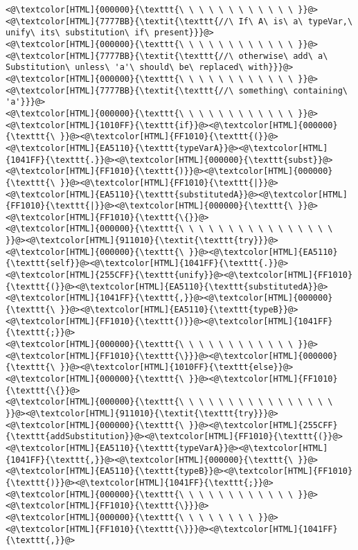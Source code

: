 \begin{lstlisting}
<@\textcolor[HTML]{000000}{\texttt{\ \ \ \ \ \ \ \ \ \ \ \ }}@><@\textcolor[HTML]{7777BB}{\textit{\texttt{//\ If\ A\ is\ a\ typeVar,\ unify\ its\ substitution\ if\ present}}}@>
<@\textcolor[HTML]{000000}{\texttt{\ \ \ \ \ \ \ \ \ \ \ \ }}@><@\textcolor[HTML]{7777BB}{\textit{\texttt{//\ otherwise\ add\ a\ Substitution\ unless\ 'a'\ should\ be\ replaced\ with}}}@>
<@\textcolor[HTML]{000000}{\texttt{\ \ \ \ \ \ \ \ \ \ \ \ }}@><@\textcolor[HTML]{7777BB}{\textit{\texttt{//\ something\ containing\ 'a'}}}@>
<@\textcolor[HTML]{000000}{\texttt{\ \ \ \ \ \ \ \ \ \ \ \ }}@><@\textcolor[HTML]{1010FF}{\texttt{if}}@><@\textcolor[HTML]{000000}{\texttt{\ }}@><@\textcolor[HTML]{FF1010}{\texttt{(}}@><@\textcolor[HTML]{EA5110}{\texttt{typeVarA}}@><@\textcolor[HTML]{1041FF}{\texttt{.}}@><@\textcolor[HTML]{000000}{\texttt{subst}}@><@\textcolor[HTML]{FF1010}{\texttt{)}}@><@\textcolor[HTML]{000000}{\texttt{\ }}@><@\textcolor[HTML]{FF1010}{\texttt{|}}@><@\textcolor[HTML]{EA5110}{\texttt{substitutedA}}@><@\textcolor[HTML]{FF1010}{\texttt{|}}@><@\textcolor[HTML]{000000}{\texttt{\ }}@><@\textcolor[HTML]{FF1010}{\texttt{\{}}@>
<@\textcolor[HTML]{000000}{\texttt{\ \ \ \ \ \ \ \ \ \ \ \ \ \ \ \ }}@><@\textcolor[HTML]{911010}{\textit{\texttt{try}}}@><@\textcolor[HTML]{000000}{\texttt{\ }}@><@\textcolor[HTML]{EA5110}{\texttt{self}}@><@\textcolor[HTML]{1041FF}{\texttt{.}}@><@\textcolor[HTML]{255CFF}{\texttt{unify}}@><@\textcolor[HTML]{FF1010}{\texttt{(}}@><@\textcolor[HTML]{EA5110}{\texttt{substitutedA}}@><@\textcolor[HTML]{1041FF}{\texttt{,}}@><@\textcolor[HTML]{000000}{\texttt{\ }}@><@\textcolor[HTML]{EA5110}{\texttt{typeB}}@><@\textcolor[HTML]{FF1010}{\texttt{)}}@><@\textcolor[HTML]{1041FF}{\texttt{;}}@>
<@\textcolor[HTML]{000000}{\texttt{\ \ \ \ \ \ \ \ \ \ \ \ }}@><@\textcolor[HTML]{FF1010}{\texttt{\}}}@><@\textcolor[HTML]{000000}{\texttt{\ }}@><@\textcolor[HTML]{1010FF}{\texttt{else}}@><@\textcolor[HTML]{000000}{\texttt{\ }}@><@\textcolor[HTML]{FF1010}{\texttt{\{}}@>
<@\textcolor[HTML]{000000}{\texttt{\ \ \ \ \ \ \ \ \ \ \ \ \ \ \ \ }}@><@\textcolor[HTML]{911010}{\textit{\texttt{try}}}@><@\textcolor[HTML]{000000}{\texttt{\ }}@><@\textcolor[HTML]{255CFF}{\texttt{addSubstitution}}@><@\textcolor[HTML]{FF1010}{\texttt{(}}@><@\textcolor[HTML]{EA5110}{\texttt{typeVarA}}@><@\textcolor[HTML]{1041FF}{\texttt{,}}@><@\textcolor[HTML]{000000}{\texttt{\ }}@><@\textcolor[HTML]{EA5110}{\texttt{typeB}}@><@\textcolor[HTML]{FF1010}{\texttt{)}}@><@\textcolor[HTML]{1041FF}{\texttt{;}}@>
<@\textcolor[HTML]{000000}{\texttt{\ \ \ \ \ \ \ \ \ \ \ \ }}@><@\textcolor[HTML]{FF1010}{\texttt{\}}}@>
<@\textcolor[HTML]{000000}{\texttt{\ \ \ \ \ \ \ \ }}@><@\textcolor[HTML]{FF1010}{\texttt{\}}}@><@\textcolor[HTML]{1041FF}{\texttt{,}}@>

\end{lstlisting}
